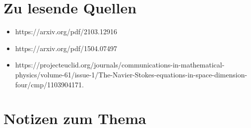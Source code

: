 \documentclass[size=12pt]{report}
\begin{document}
\section{Zu lesende Quellen}
\begin{itemize}
\item https://arxiv.org/pdf/2103.12916 \\
\item https://arxiv.org/pdf/1504.07497 \\
\item https://projecteuclid.org/journals/communications-in-mathematical-physics/volume-61/issue-1/The-Navier-Stokes-equations-in-space-dimension-four/cmp/1103904171.
\end{itemize}
%
\section{Notizen zum Thema}

\begin{align*}
    
\end{align*}
\end{document}
